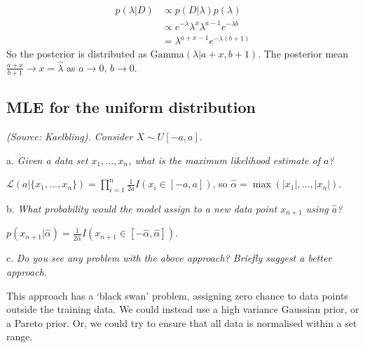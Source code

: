 \begin{align*}
p(\lambda|D) &\propto p(D|\lambda)p(\lambda)\\
&\propto e^{-\lambda}\lambda^x\lambda^{a-1}e^{-\lambda b}\\
&= \lambda^{a+x-1}e^{-\lambda(b+1)}
\end{align*}
So the posterior is distributed as $\mathrm{Gamma}(\lambda|a+x,b+1)$. The posterior mean $\frac{a+x}{b+1} \rightarrow x = \hat\lambda$ as $a\rightarrow0,\,b\rightarrow0$.

\subsection{MLE for the uniform distribution}
\textit{(Source: Kaelbling). Consider $X \sim U[-a,a]$.}

a. \textit{Given a data set $x_1, \dots, x_n$, what is the maximum likelihood estimate of $a$?}

$\mathcal{L}(a|\{x_1,\dots,x_n\}) = \prod_{i=1}^{n}\frac{1}{2a}I(x_i\in[-a,a])$, so $\hat\alpha=\max(|x_1|,\dots,|x_n|)$.

b. \textit{What probability would the model assign to a new data point $x_{n+1}$ using $\hat{a}$?}

$p(x_{n+1}|\hat\alpha) = \frac{1}{2\hat\alpha}I(x_{n+1}\in[-\hat\alpha, \hat\alpha])$.

c. \textit{Do you see any problem with the above approach? Briefly suggest a better approach.}

This approach has a `black swan' problem, assigning zero chance to data points outside the training data. We could instead use a high variance Gaussian prior, or a Pareto prior. Or, we could try to ensure that all data is normalised within a set range.


